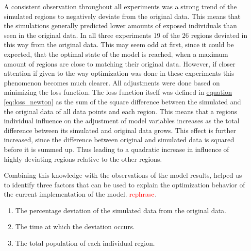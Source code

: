 A consistent observation throughout all experiments was a strong trend of the simulated regions to negatively deviate from the
original data. This means that the simulations generally predicted lower amounts of exposed individuals than seen in the original
data. In all three experiments 19 of the 26 regions deviated in this way from the original data. This may seem odd at first,
since it could be expected, that the optimal state of the model is reached, when a maximum amount of regions are close to matching
their original data. However, if  closer attention if given to the way optimization was done in these experiments this phenomenon
becomes much clearer. All adjustments were done based on minimizing the loss function. The loss function itself was defined in
\hyperref[eq:loss_newton]{equation \ref*{eq:loss_newton}} as the sum of the square difference between the simulated and the original
data of all data points and each region. This means that a regions individual influence on the adjustment of model variables
increases as the total difference between its simulated and original data grows. This effect is further increased, since the
difference between original and simulated data is squared before it is summed up. Thus leading to a quadratic increase in influence
of highly deviating regions relative to the other regions. \newline

Combining this knowledge with the observations of the model results, helped us to identify three factors that can be used to explain
the optimization behavior of the current implementation of the model. \textcolor{red}{rephrase}.

\begin{enumerate}[label=\arabic*.]
	\item The percentage deviation of the simulated data from the original data.
	\item The time at which the deviation occurs.
	\item The total population of each individual region.
\end{enumerate}

